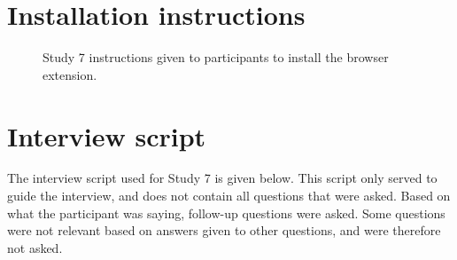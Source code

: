 \section{Installation instructions}
\begin{figure}[!htp] 
\caption[Study 7 installation instructions]{Study 7 instructions given to participants to install the browser extension.}
\label{fig:ch67-Study7Instructions}
\end{figure} 

\section{ Interview script}
The interview script used for Study 7 is given below. This script only served to guide the interview, and does not contain all questions that were asked.  Based on what the participant was saying, follow-up questions were asked. Some questions were not relevant based on answers given to other questions, and were therefore not asked.

